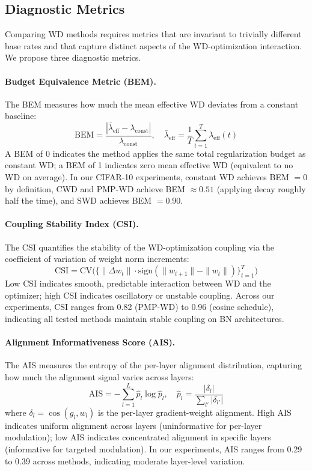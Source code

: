 \documentclass{article}
\begin{document}
\subsection{Diagnostic Metrics}
\label{sec:metrics}

Comparing WD methods requires metrics that are invariant to trivially different base rates and that capture distinct aspects of the WD-optimization interaction. We propose three diagnostic metrics.

\paragraph{Budget Equivalence Metric (BEM).} The BEM measures how much the mean effective WD deviates from a constant baseline:
\begin{equation}
\text{BEM} = \frac{|\bar{\lambda}_{\text{eff}} - \lambda_{\text{const}}|}{\lambda_{\text{const}}}, \quad \bar{\lambda}_{\text{eff}} = \frac{1}{T} \sum_{t=1}^{T} \lambda_{\text{eff}}(t)
\label{eq:bem}
\end{equation}
A BEM of 0 indicates the method applies the same total regularization budget as constant WD; a BEM of 1 indicates zero mean effective WD (equivalent to no WD on average). In our CIFAR-10 experiments, constant WD achieves BEM $= 0$ by definition, CWD and PMP-WD achieve BEM $\approx 0.51$ (applying decay roughly half the time), and SWD achieves BEM $= 0.90$.

\paragraph{Coupling Stability Index (CSI).} The CSI quantifies the stability of the WD-optimization coupling via the coefficient of variation of weight norm increments:
\begin{equation}
\text{CSI} = \text{CV}\bigl(\{\|\Delta w_t\| \cdot \text{sign}(\|w_{t+1}\| - \|w_t\|)\}_{t=1}^{T}\bigr)
\label{eq:csi}
\end{equation}
Low CSI indicates smooth, predictable interaction between WD and the optimizer; high CSI indicates oscillatory or unstable coupling. Across our experiments, CSI ranges from 0.82 (PMP-WD) to 0.96 (cosine schedule), indicating all tested methods maintain stable coupling on BN architectures.

\paragraph{Alignment Informativeness Score (AIS).} The AIS measures the entropy of the per-layer alignment distribution, capturing how much the alignment signal varies across layers:
\begin{equation}
\text{AIS} = -\sum_{l=1}^{L} \hat{p}_l \log \hat{p}_l, \quad \hat{p}_l = \frac{|\delta_l|}{\sum_{l'} |\delta_{l'}|}
\label{eq:ais}
\end{equation}
where $\delta_l = \cos(g_l, w_l)$ is the per-layer gradient-weight alignment. High AIS indicates uniform alignment across layers (uninformative for per-layer modulation); low AIS indicates concentrated alignment in specific layers (informative for targeted modulation). In our experiments, AIS ranges from 0.29 to 0.39 across methods, indicating moderate layer-level variation.
\end{document}
